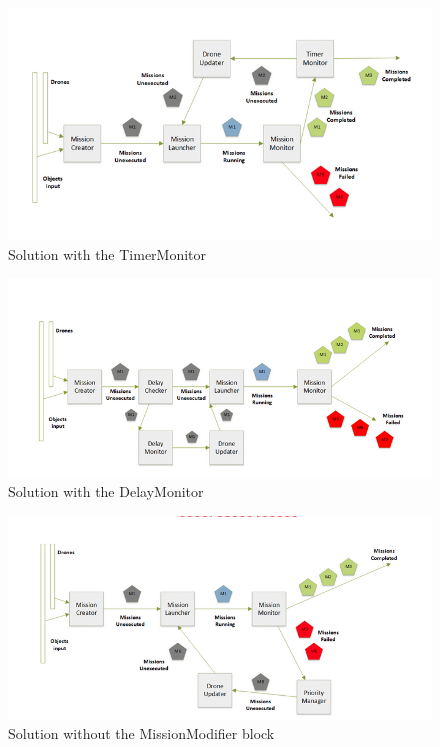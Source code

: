 \begin{figure}[H]
  \centering
  \includegraphics[width=\linewidth]{pictures/NoClock.png}
  \caption{Solution with the TimerMonitor}
  \label{fig:noClock}
\end{figure}


\begin{figure}[H]
  \centering
  \includegraphics[width=\linewidth]{pictures/DelayMonitor.png}
  \caption{Solution with the DelayMonitor}
  \label{fig:delayMonitor}
\end{figure}

\begin{figure}[H]
  \centering
  \includegraphics[width=\linewidth]{pictures/NoMM.png}
  \caption{Solution without the MissionModifier block}
  \label{fig:noMM}
\end{figure}

